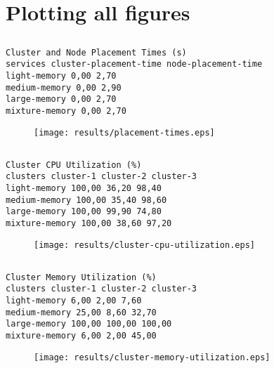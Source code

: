 \documentclass{elsart}
\begin{document}
\section{Plotting all figures}
\subsection{}

\begin{lstlisting}[caption={}]
Cluster and Node Placement Times (s)
services cluster-placement-time node-placement-time
light-memory 0,00 2,70
medium-memory 0,00 2,90
large-memory 0,00 2,70
mixture-memory 0,00 2,70
\end{lstlisting}

\begin{figure}[ht]
\centering
\texttt{[image: results/placement-times.eps]}
\caption{}\label{fig:placement-times.eps}
\end{figure}

\subsection{}

\begin{lstlisting}[caption={}]
Cluster CPU Utilization (%)
clusters cluster-1 cluster-2 cluster-3
light-memory 100,00 36,20 98,40
medium-memory 100,00 35,40 98,60
large-memory 100,00 99,90 74,80
mixture-memory 100,00 38,60 97,20
\end{lstlisting}

\begin{figure}[ht]
\centering
\texttt{[image: results/cluster-cpu-utilization.eps]}
\caption{}\label{fig:cluster-cpu-utilization.eps}
\end{figure}

\subsection{}

\begin{lstlisting}[caption={}]
Cluster Memory Utilization (%)
clusters cluster-1 cluster-2 cluster-3
light-memory 6,00 2,00 7,60
medium-memory 25,00 8,60 32,70
large-memory 100,00 100,00 100,00
mixture-memory 6,00 2,00 45,00
\end{lstlisting}

\begin{figure}[ht]
\centering
\texttt{[image: results/cluster-memory-utilization.eps]}
\caption{}\label{fig:cluster-memory-utilization.eps}
\end{figure}
\end{document}
